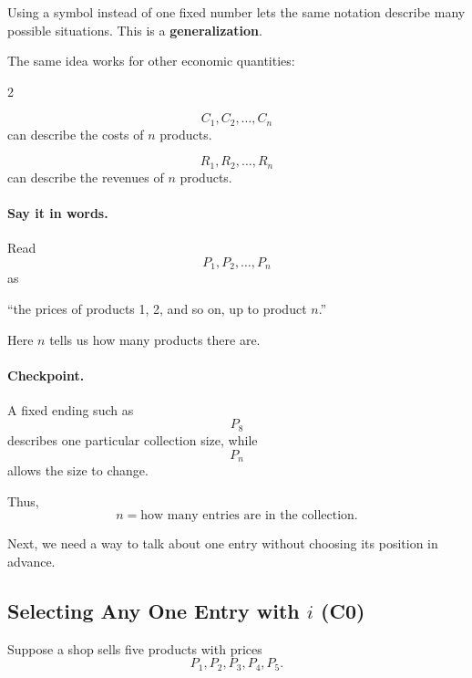 	Using a symbol instead of one fixed number lets the same notation describe many possible situations. This is a \textbf{generalization}.
	
	The same idea works for other economic quantities:
	
	{
		\setlength{\columnseprule}{0.4pt}
		\setlength{\columnsep}{1.5em}
		\begin{multicols}{2}
			
			\[
			C_1,C_2,\ldots,C_n
			\]
			can describe the costs of $n$ products.
			
			\columnbreak
			
			\[
			R_1,R_2,\ldots,R_n
			\]
			can describe the revenues of $n$ products.
			
		\end{multicols}
	}
	
	\paragraph{Say it in words.}
	
	Read
	\[
	P_1,P_2,\ldots,P_n
	\]
	as
	
	\begin{center}
		``the prices of products 1, 2, and so on, up to product $n$.''
	\end{center}
	
	Here $n$ tells us how many products there are.
	
	\paragraph{Checkpoint.}
	
	A fixed ending such as
	\[
	P_8
	\]
	describes one particular collection size, while
	\[
	P_n
	\]
	allows the size to change.
	
	Thus,
	\[
	\boxed{n=\text{how many entries are in the collection}.}
	\]
	
	Next, we need a way to talk about one entry without choosing its position in advance.
	
	
	\subsection{Selecting Any One Entry with $i$ (C0)}
	\label{sec:position-i-c0}
	
	Suppose a shop sells five products with prices
	\[
	P_1,P_2,P_3,P_4,P_5.
	\]
	
